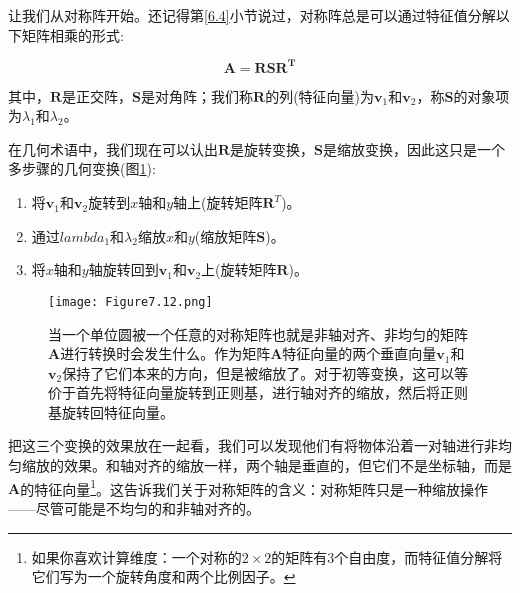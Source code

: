 让我们从对称阵开始。还记得第\ref{6.4}小节说过，对称阵总是可以通过特征值分解以下矩阵相乘的形式:

\begin{equation}
    \mathbf{A} = \mathbf{R}\mathbf{S}\mathbf{R}^{\mathbf{T}}
    \nonumber
\end{equation}

其中，$\mathbf{R}$是正交阵，$\mathbf{S}$是对角阵；我们称$\mathbf{R}$的列(特征向量)为$\mathbf{v}_{1}$和$\mathbf{v}_{2}$，称$\mathbf{S}$的对象项为$\lambda_{1}$和$\lambda_{2}$。

在几何术语中，我们现在可以认出$\mathbf{R}$是旋转变换，$\mathbf{S}$是缩放变换，因此这只是一个多步骤的几何变换(图\ref{fig:7.12}):

\begin{enumerate}
	\item 将$\mathbf{v}_{1}$和$\mathbf{v}_{2}$旋转到$x$轴和$y$轴上(旋转矩阵$\mathbf{R}^{T}$)。
	
	\item 通过$lambda_{1}$和$\lambda_{2}$缩放$x$和$y$(缩放矩阵$\mathbf{S}$)。
	
	\item 将$x$轴和$y$轴旋转回到$\mathbf{v}_{1}$和$\mathbf{v}_{2}$上(旋转矩阵$\mathbf{R}$)。
\end{enumerate}

\begin{figure}[htbp]
	\centering
	\texttt{[image: Figure7.12.png]}
	\caption{当一个单位圆被一个任意的对称矩阵也就是非轴对齐、非均匀的矩阵$\mathbf{A}$进行转换时会发生什么。作为矩阵$\mathbf{A}$特征向量的两个垂直向量$\mathbf{v}_{1}$和$\mathbf{v}_{2}$保持了它们本来的方向，但是被缩放了。对于初等变换，这可以等价于首先将特征向量旋转到正则基，进行轴对齐的缩放，然后将正则基旋转回特征向量。}
	\label{fig:7.12}
\end{figure}	

把这三个变换的效果放在一起看，我们可以发现他们有将物体沿着一对轴进行非均匀缩放的效果。和轴对齐的缩放一样，两个轴是垂直的，但它们不是坐标轴，而是$\mathbf{A}$的特征向量\footnote{如果你喜欢计算维度：一个对称的$2 \times 2$的矩阵有3个自由度，而特征值分解将它们写为一个旋转角度和两个比例因子。}。这告诉我们关于对称矩阵的含义：对称矩阵只是一种缩放操作——尽管可能是不均匀的和非轴对齐的。


